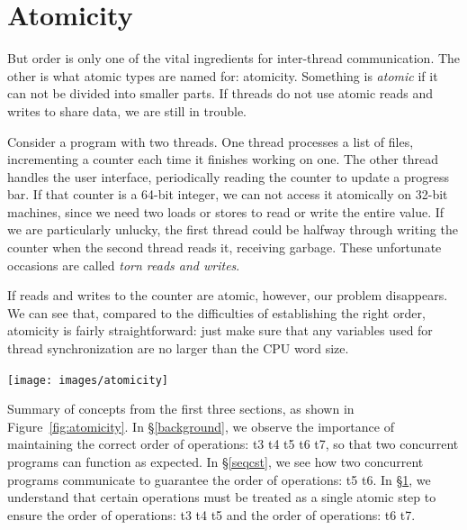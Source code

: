 \documentclass[fontsize=10pt, oneside]{scrartcl}
\newcommand{\fig}[1]{Figure~\ref{#1}}
\newcommand{\introduce}[1]{\textit{#1}}
\newcommand{\secref}[1]{\hyperref[#1]{\textsc{\S}\ref*{#1}}}
\begin{document}
\section{Atomicity}
\label{atomicity}
But order is only one of the vital ingredients for inter-thread communication.
The other is what atomic types are named for: atomicity.
Something is \introduce{atomic} if it can not be divided into smaller parts.
If threads do not use atomic reads and writes to share data, we are still in trouble.

Consider a program with two threads.
One thread processes a list of files, incrementing a counter each time it finishes working on one.
The other thread handles the user interface, periodically reading the counter to update a progress bar.
If that counter is a 64-bit integer, we can not access it atomically on 32-bit machines,
since we need two loads or stores to read or write the entire value.
If we are particularly unlucky, the first thread could be halfway through writing the counter when the second thread reads it,
receiving garbage.
These unfortunate occasions are called \introduce{torn reads and writes}.

If reads and writes to the counter are atomic, however, our problem disappears.
We can see that, compared to the difficulties of establishing the right order,
atomicity is fairly straightforward:
just make sure that any variables used for thread synchronization
are no larger than the \textsc{CPU} word size.

\texttt{[image: images/atomicity]}
\label{fig:atomicity}

Summary of concepts from the first three sections, as shown in \fig{fig:atomicity}.
In \secref{background}, we observe the importance of maintaining the correct order of operations: t3 \to t4 \to t5 \to t6 \to t7, so that two concurrent programs can function as expected.
In \secref{seqcst}, we see how two concurrent programs communicate to guarantee the order of operations: t5 \to t6.
In \secref{atomicity}, we understand that certain operations must be treated as a single atomic step to ensure the order of operations: t3 \to t4 \to t5 and the order of operations: t6 \to t7.
\end{document}
